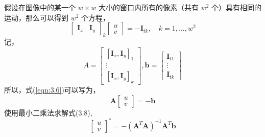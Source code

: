 假设在图像中的某一个 $w \times w $ 大小的窗口内所有的像素（共有 $w^2 $ 个）具有相同的运动，那么可以得到 $w^2 $ 个方程，
\begin{equation}
\label{eqn:3.6}
\left[ \begin{array}{cc}{\boldsymbol{I}_{x}} & {\boldsymbol{I}_{y}}\end{array}\right]_{k} \left[ \begin{array}{c}{u} \\ {v}\end{array}\right]=-\boldsymbol{I}_{t k}, \quad k=1, \ldots, w^{2}
\end{equation}
记，
\begin{equation}
\label{eqn:3.7}
A=\left[ \begin{array}{c}{\left[\boldsymbol{I}_{x}, \boldsymbol{I}_{y}\right]_{1}} \\ {\vdots} \\ {\left[\boldsymbol{I}_{x}, \boldsymbol{I}_{y}\right]_{k}}\end{array}\right], \boldsymbol{b}=\left[ \begin{array}{c}{\boldsymbol{I}_{t 1}} \\ {\vdots} \\ {\boldsymbol{I}_{t k}}\end{array}\right]
\end{equation}
所以，式(\ref{eqn:3.6})可以写为，
\begin{equation}
\label{eqn:3.8}
\boldsymbol{A} \left[ \begin{array}{l}{u} \\ {v}\end{array}\right]=-\boldsymbol{b}
\end{equation}
使用最小二乘法求解式(3.8),
\begin{equation}
\label{eqn:3.9}
\left[ \begin{array}{c}{u} \\ {v}\end{array}\right]^{*}=-\left(\boldsymbol{A}^{T} \boldsymbol{A}\right)^{-1} \boldsymbol{A}^{T} \boldsymbol{b}
\end{equation}

